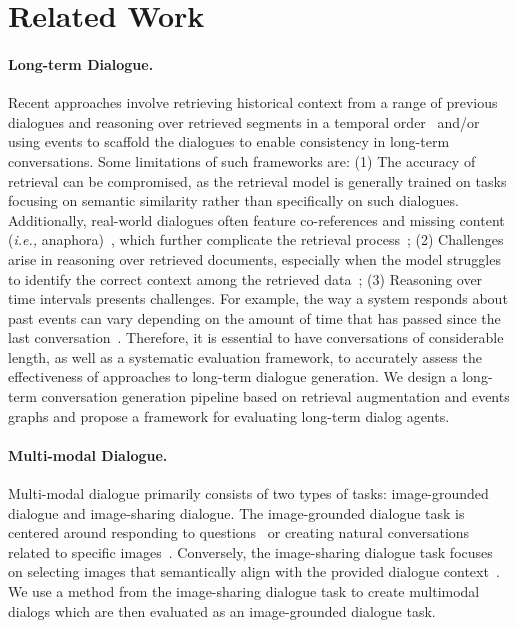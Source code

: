 \section{Related Work}

\paragraph{Long-term Dialogue.} 
Recent approaches involve retrieving historical context from a range of previous dialogues and reasoning over retrieved segments in a temporal order~\cite{lee2023prompted, lu2023memochat, zhong2023memorybank, liang2023unleashing} and/or using events to scaffold the dialogues \cite{jang2023conversation, zhang2023mind} to enable consistency in long-term conversations. Some limitations of such frameworks are:
(1) The accuracy of retrieval can be compromised, as the retrieval model is generally trained on tasks focusing on semantic similarity rather than specifically on such dialogues.
Additionally, real-world dialogues often feature co-references and missing content (\textit{i.e.,} anaphora)~\cite{anantha2021open}, which further complicate the retrieval process~\cite{mallen-etal-2023-trust, gao2023enabling, liu2023evaluating};
(2) Challenges arise in reasoning over retrieved documents, especially when the model struggles to identify the correct context among the retrieved data~\cite{liu2023lost};
(3) Reasoning over time intervals presents challenges. For example, the way a system responds about past events can vary depending on the amount of time that has passed since the last conversation~\cite{zhang2023mind, jang2023conversation}.
Therefore, it is essential to have conversations of considerable length, as well as a systematic evaluation framework, to accurately assess the effectiveness of approaches to long-term dialogue generation. We design a long-term conversation generation pipeline based on retrieval augmentation and events graphs and propose a framework for evaluating long-term dialog agents.

\paragraph{Multi-modal Dialogue.}
Multi-modal dialogue primarily consists of two types of tasks: image-grounded dialogue and image-sharing dialogue. 
The image-grounded dialogue task is centered around responding to questions~\cite{antol2015vqa, das2017visual, kottur2019clevr} or creating natural conversations related to specific images~\cite{mostafazadeh2017image, shuster2020image, meng2020openvidial, zheng2021mmchat}. 
Conversely, the image-sharing dialogue task focuses on selecting images that semantically align with the provided dialogue context~\cite{zang2021photochat, feng2023mmdialog, lee2023dialogcc}. We use a method from the image-sharing dialogue task to create multimodal dialogs which are then evaluated as an image-grounded dialogue task. 


